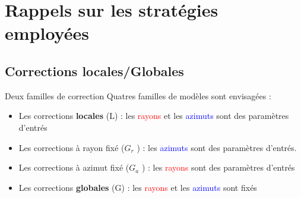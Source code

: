 \documentclass[
11pt,notheorems,hyperref={pdfauthor=whatever}
]{beamer}
\begin{document}
\section{Rappels sur les stratégies employées}

\subsection{Corrections locales/Globales}

\begin{frame}{Deux familles de correction}
    Quatres familles de modèles sont envisagées :
    \begin{center}
    \begin{itemize}
    \item Les corrections \textbf{locales} (L) : les \textcolor{red}{rayons} et les \textcolor{blue}{azimuts} sont des paramètres d’entrés
    \item Les corrections à rayon fixé ($G_r$ ) : les \textcolor{blue}{azimuts}  sont des paramètres d’entrés.
    \item Les corrections à azimut fixé ($G_a$ ) : les \textcolor{red}{rayons} sont des paramètres d’entrés
    \item Les corrections \textbf{globales} (G) : les \textcolor{red}{rayons} et les \textcolor{blue}{azimuts}  sont fixés
    \end{itemize}
\end{center}
\end{frame}
\end{document}
